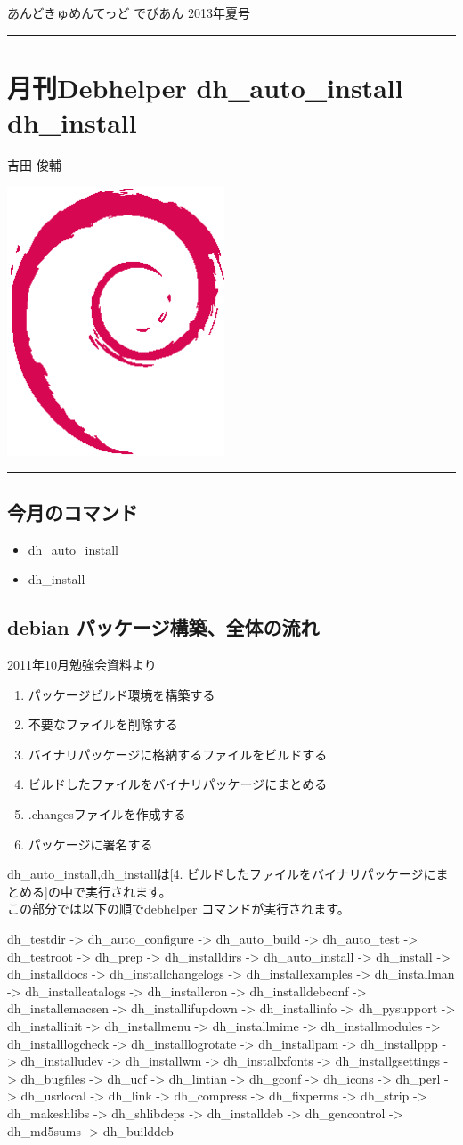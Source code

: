 \documentclass[mingoth,a4paper]{jsarticle}
\renewcommand{\dancersection}[2]{%
\newpage
あんどきゅめんてっど でびあん 2013年夏号
%
\vspace{0.1mm}\\
{\color{dancerdarkblue}\rule{\hsize}{2mm}}

%
%
\begin{minipage}[t]{0.6\hsize}
\color{dancerdarkblue}
\vspace{1cm}
\section{#1}
\hfill{}#2\\
\end{minipage}
\begin{minipage}[t]{0.4\hsize}
\vspace{-2cm}
\hfill{}\includegraphics[height=8cm]{image200502/openlogo-nd.eps}\\
\vspace{-5cm}
\end{minipage}
%
{\color{dancerlightblue}\rule{0.66\hsize}{2mm}}
%
\vspace{2cm}
}
\begin{document}
%

\dancersection{月刊Debhelper dh\_auto\_install dh\_install}{吉田 俊輔}

\subsection{今月のコマンド}
{\Large
\begin{itemize}
\item dh\_auto\_install
\item dh\_install
\end{itemize}
}


\subsection{debian パッケージ構築、全体の流れ}
2011年10月勉強会資料より
\begin{enumerate}
\item パッケージビルド環境を構築する
\item 不要なファイルを削除する
\item バイナリパッケージに格納するファイルをビルドする
\item ビルドしたファイルをバイナリパッケージにまとめる
\item .changesファイルを作成する
\item パッケージに署名する
\end{enumerate}

dh\_auto\_install,dh\_installは[4. ビルドしたファイルをバイナリパッケージにまとめる]の中で実行されます。
\\
この部分では以下の順でdebhelper コマンドが実行されます。
\begin{commandline}
dh_testdir -> dh_auto_configure -> dh_auto_build -> dh_auto_test
-> dh_testroot -> dh_prep -> dh_installdirs -> dh_auto_install
-> dh_install -> dh_installdocs -> dh_installchangelogs
-> dh_installexamples -> dh_installman -> dh_installcatalogs
-> dh_installcron -> dh_installdebconf -> dh_installemacsen
-> dh_installifupdown -> dh_installinfo -> dh_pysupport
-> dh_installinit -> dh_installmenu -> dh_installmime
-> dh_installmodules -> dh_installlogcheck -> dh_installlogrotate
-> dh_installpam -> dh_installppp -> dh_installudev -> dh_installwm
-> dh_installxfonts -> dh_installgsettings -> dh_bugfiles -> dh_ucf
-> dh_lintian -> dh_gconf -> dh_icons -> dh_perl -> dh_usrlocal
-> dh_link -> dh_compress -> dh_fixperms -> dh_strip -> dh_makeshlibs
-> dh_shlibdeps -> dh_installdeb -> dh_gencontrol -> dh_md5sums
-> dh_builddeb
\end{commandline}
\end{document}
